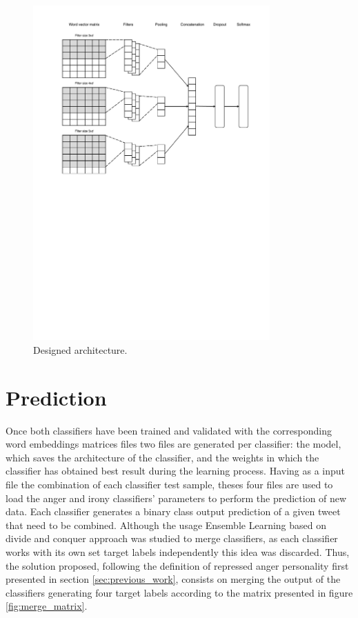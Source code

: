 \begin{figure}[!htp]
  \center
  \includegraphics[width=0.81\textwidth]{figures/designed_architecture}
  \caption{Designed architecture.}
  \label{fig:designed_architecture}
\end{figure}

\section{Prediction}

Once both classifiers have been trained and validated with the corresponding word embeddings matrices files two files are generated per classifier: the model, which saves the architecture of the classifier, and the weights in which the classifier has obtained best result during the learning process. Having as a input file the combination of each classifier test sample, theses four files are used to load the anger and irony classifiers' parameters to perform the prediction of new data. Each classifier generates a binary class output prediction of a given tweet that need to be combined. Although the usage Ensemble Learning based on divide and conquer \cite{ensemble2009Polikar} approach was studied to merge classifiers, as each classifier works with its own set target labels independently this idea was discarded. Thus, the solution proposed, following the definition of repressed anger personality first presented in section \ref{sec:previous_work}, consists on merging the output of the classifiers generating four target labels according to the matrix presented in figure \ref{fig:merge_matrix}.

